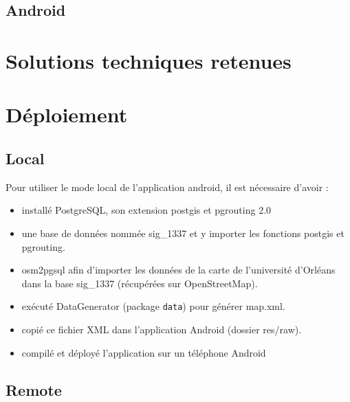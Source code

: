 \documentclass[12pt,a4paper,oneside]{article}
\begin{document}
\newpage

\subsection{Android}


\newpage

\section{Solutions techniques retenues}



\newpage







\newpage

\section{Déploiement}

\subsection{Local}

Pour utiliser le mode local de l'application android, il est nécessaire d'avoir :
\begin{itemize}
\item installé PostgreSQL, son extension postgis et pgrouting 2.0
\item une base de données nommée sig\_1337 et y importer les fonctions postgis et pgrouting.
\item osm2pgsql afin d'importer les données de la carte de l'université d'Orléans dans la base sig\_1337 (récupérées sur OpenStreetMap).
\item exécuté DataGenerator (package \texttt{data}) pour générer map.xml.
\item copié ce fichier XML dans l'application Android (dossier res/raw).
\item compilé et déployé l'application sur un téléphone Android  \\
\end{itemize}

\subsection{Remote}
\end{document}
